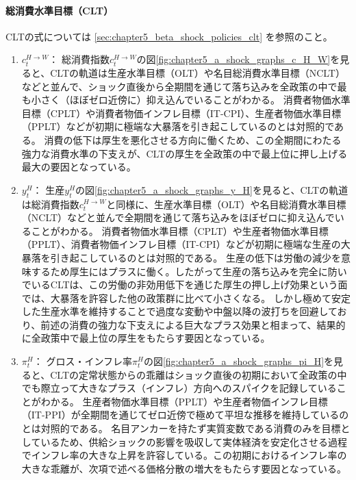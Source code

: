 \paragraph{総消費水準目標（CLT）}
\label{sec:chapter5_a_shock_policies_clt}
CLTの式については
\ref{sec:chapter5_beta_shock_policies_clt}
を参照のこと。
\begin{enumerate}
    \item
    \label{itm:chapter5_a_shock_policies_clt_c_H_W}
        \(c_t^{H\to W}\)：
        総消費指数\(c_t^{H\to W}\)の図\ref{fig:chapter5_a_shock_graphs_c_H_W}を見ると、CLTの軌道は生産水準目標（OLT）や名目総消費水準目標（NCLT）などと並んで、ショック直後から全期間を通じて落ち込みを全政策の中で最も小さく（ほぼゼロ近傍に）抑え込んでいることがわかる。
        消費者物価水準目標（CPLT）や消費者物価インフレ目標（IT-CPI）、生産者物価水準目標（PPLT）などが初期に極端な大暴落を引き起こしているのとは対照的である。
        消費の低下は厚生を悪化させる方向に働くため、この全期間にわたる強力な消費水準の下支えが、CLTの厚生を全政策の中で最上位に押し上げる最大の要因となっている。
    \item
    \label{itm:chapter5_a_shock_policies_clt_y_H}
        \(y_t^H\)：
        生産\(y_t^H\)の図\ref{fig:chapter5_a_shock_graphs_y_H}を見ると、CLTの軌道は総消費指数\(c_t^{H\to W}\)と同様に、生産水準目標（OLT）や名目総消費水準目標（NCLT）などと並んで全期間を通じて落ち込みをほぼゼロに抑え込んでいることがわかる。
        消費者物価水準目標（CPLT）や生産者物価水準目標（PPLT）、消費者物価インフレ目標（IT-CPI）などが初期に極端な生産の大暴落を引き起こしているのとは対照的である。
        生産の低下は労働の減少を意味するため厚生にはプラスに働く。したがって生産の落ち込みを完全に防いでいるCLTは、この労働の非効用低下を通じた厚生の押し上げ効果という面では、大暴落を許容した他の政策群に比べて小さくなる。
        しかし極めて安定した生産水準を維持することで過度な変動や中盤以降の波打ちを回避しており、前述の消費の強力な下支えによる巨大なプラス効果と相まって、結果的に全政策中で最上位の厚生をもたらす要因となっている。
    \item
    \label{itm:chapter5_a_shock_policies_clt_pi_H}
        \(\pi_t^H\)：
        グロス・インフレ率\(\pi_t^H\)の図\ref{fig:chapter5_a_shock_graphs_pi_H}を見ると、CLTの定常状態からの乖離はショック直後の初期において全政策の中でも際立って大きなプラス（インフレ）方向へのスパイクを記録していることがわかる。
        生産者物価水準目標（PPLT）や生産者物価インフレ目標（IT-PPI）が全期間を通じてゼロ近傍で極めて平坦な推移を維持しているのとは対照的である。
        名目アンカーを持たず実質変数である消費のみを目標としているため、供給ショックの影響を吸収して実体経済を安定化させる過程でインフレ率の大きな上昇を許容している。この初期におけるインフレ率の大きな乖離が、次項で述べる価格分散の増大をもたらす要因となっている。
    
\end{enumerate}